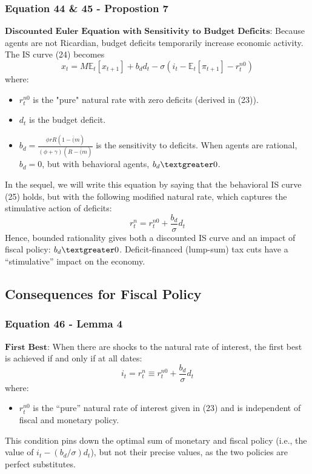 \documentclass{article}
\begin{document}
\subsubsection*{Equation 44 \& 45 - Propostion 7}
$\textbf{Discounted Euler Equation with Sensitivity to Budget Deficits}$: Because agents are not Ricardian, budget deficits temporarily increase economic activity.
The IS curve (24) becomes
\begin{equation}\tag{44}
    x_{t}=M\mathbb{E}_{t}\left[x_{t+1}\right]+b_{d}d_{t}-\sigma\left(i_{t}-\mathbb{E}_{t}\left[\pi_{t+1}\right]-r_{t}^{n0}\right)
\end{equation}
where:
\begin{itemize}
    \item $r_{t}^{n0}$ is the "pure" natural rate with zero deficits (derived in (23)).
    \item $d_{t}$ is the budget deficit.
    \item $b_{d}=\frac{\phi rR(1-\overline(m)}{(\phi+\gamma)(R-\overline(m)}$ is the sensitivity to deficits. When agents are rational, $b_{d}=0$, but with behavioral agents, $b_{d}\textgreater0$.
\end{itemize}
In the sequel, we will write this equation by saying that the behavioral IS curve (25) holds, but with the following modified natural rate, which captures the stimulative action of deficits:
\begin{equation}\tag{45}
    r_{t}^{n}=r_{t}^{n0}+\frac{b_{d}}{\sigma}d_{t}
\end{equation}
Hence, bounded rationality gives both a discounted IS curve and an impact of fiscal policy: $b_{d} \textgreater 0$. Deficit-financed (lump-sum) tax cuts have a “stimulative” impact on the economy.

\subsection{Consequences for Fiscal Policy}

\subsubsection*{Equation 46 - Lemma 4}
$\textbf{First Best}$: When there are shocks to the natural rate of interest, the first best is achieved if and only if at all dates:
\begin{equation}\tag{46}
    i_{t}=r_{t}^{n}\equiv r_{t}^{n0}+\frac{b_{d}}{\sigma}d_{t}
\end{equation}
where:
\begin{itemize}
    \item $r_{t}^{n0}$ is the “pure” natural rate of interest given in (23) and is independent of fiscal and monetary policy.
\end{itemize}
This condition pins down the optimal sum of monetary
and fiscal policy (i.e., the value of $i_{t}-(b_{d}/\sigma)d_{t}$), but not their precise values, as the two policies are perfect substitutes.
\end{document}
